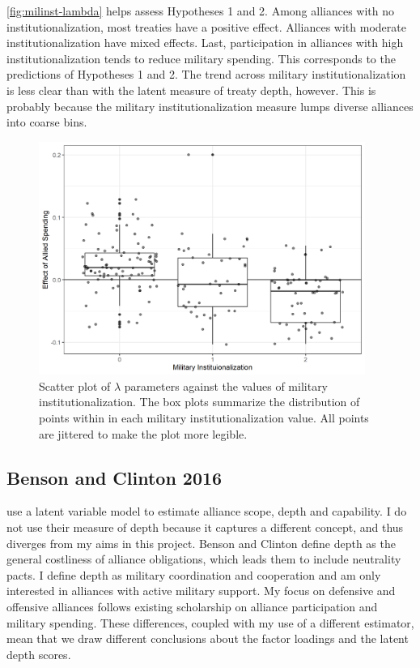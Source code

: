 \documentclass[12pt]{article}
\begin{document}
\autoref{fig:milinst-lambda} helps assess Hypotheses 1 and 2. 
Among alliances with no institutionalization, most treaties have a positive effect. 
Alliances with moderate institutionalization have mixed effects. 
Last, participation in alliances with high institutionalization tends to reduce military spending. 
This corresponds to the predictions of Hypotheses 1 and 2. 
The trend across military institutionalization is less clear than with the latent measure of treaty depth, however.
This is probably because the military institutionalization measure lumps diverse alliances into coarse bins. 


\begin{figure}[htbp]
	\centering
		\includegraphics[width=0.95\textwidth]{milinst-lambda.png}
	\caption{Scatter plot of $\lambda$ parameters against the values of military institutionalization. The box plots summarize the distribution of points within in each military institutionalization value. All points are jittered to make the plot more legible.}
	\label{fig:milinst-lambda}
\end{figure}



\subsection{Benson and Clinton 2016}


\citet{BensonClinton2016} use a latent variable model to estimate alliance scope, depth and capability. 
I do not use their measure of depth because it captures a different concept, and thus diverges from my aims in this project. 
Benson and Clinton define depth as the general costliness of alliance obligations, which leads them to include neutrality pacts. 
I define depth as military coordination and cooperation and am only interested in alliances with active military support. 
My focus on defensive and offensive alliances follows existing scholarship on alliance participation and military spending.
These differences, coupled with my use of a different estimator, mean that we draw different conclusions about the factor loadings and the latent depth scores.
\end{document}
